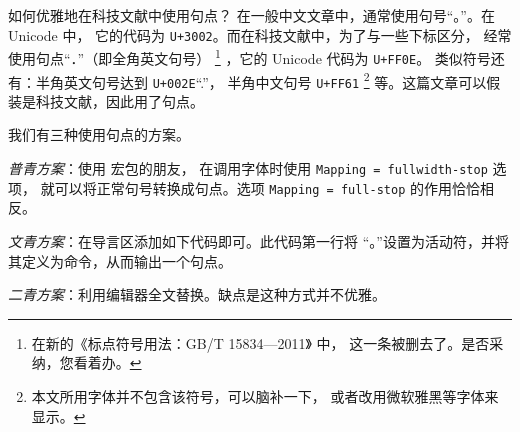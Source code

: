 \begin{myQA}{如何优雅地在科技文献中使用句点？}
	在一般中文文章中，通常使用句号“{。}”。在 Unicode 中，
	它的代码为 \verb|U+3002|。而在科技文献中，为了与一些下标区分，
	经常使用句点“．”（即全角英文句号）
	\footnote{在新的《标点符号用法：GB/T 15834—2011》
		\textsuperscript{\cite{GB/T15834-2011标点符号}} 中，
		这一条被删去了。是否采纳，您看着办。}
	，它的 Unicode 代码为 \verb|U+FF0E|。
	类似符号还有：半角英文句号达到 \verb|U+002E|“.”，
	半角中文句号 \verb|U+FF61|
	\footnote{本文所用字体并不包含该符号，可以脑补一下，
		或者改用微软雅黑等字体来显示。}
	等。这篇文章可以假装是科技文献，因此用了句点。
	
	我们有三种使用句点的方案。
	
	\emph{普青方案}：使用   宏包的朋友，
	在调用字体时使用
	\verb|Mapping = fullwidth-stop|  选项，
	就可以将正常句号转换成句点。选项 \verb|Mapping = full-stop|
	的作用恰恰相反。
	
	\emph{文青方案}：在导言区添加如下代码即可。此代码第一行将
	“{。}”设置为活动符，并将其定义为命令，从而输出一个句点。
	 
	
	\emph{二青方案}：利用编辑器全文替换。缺点是这种方式并不优雅。
	
\end{myQA}

